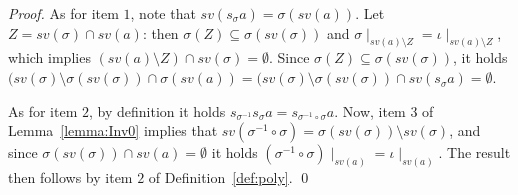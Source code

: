 \documentclass{llncs}
\def\monop{\otimes}
\begin{document}
\begin{proof}
	As for item $1$, note that $sv(s_{\sigma} a) = \sigma(sv(a))$. Let $Z = sv(\sigma) \cap sv(a)$: 
	then $\sigma(Z) \subseteq \sigma(sv(\sigma))$ and $\sigma \mid_{sv(a) \setminus Z} = \iota \mid_{sv(a) \setminus Z}$, which implies $(sv(a) \setminus Z) \cap sv(\sigma) = \emptyset$.
	Since $\sigma(Z) \subseteq \sigma(sv(\sigma))$, it holds $(sv(\sigma) \setminus \sigma(sv(\sigma)) \cap \sigma(sv(a)) = (sv(\sigma) \setminus \sigma(sv(\sigma)) \cap sv(s_{\sigma} a) = \emptyset$.

	As for item $2$, by definition it holds $s_{\sigma^{-1}} s_{\sigma} a = s_{\sigma^{-1} \circ \sigma} a$. 
	Now, item $3$ of Lemma~\ref{lemma:Inv0} implies that $sv(\sigma^{-1} \circ \sigma) = \sigma(sv(\sigma)) \setminus sv(\sigma)$, 
	and since $\sigma(sv(\sigma)) \cap sv(a) = \emptyset$ it holds $(\sigma^{-1} \circ \sigma) \mid _{sv(a)} = \iota \mid _{sv(a)}$.
	The result then follows by item $2$ of Definition~\ref{def:poly}.	
\qed	
\end{proof}
\end{document}
